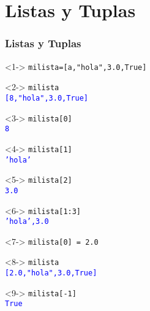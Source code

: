 \documentclass[12pt]{beamer}
\begin{document}
\section{Listas y Tuplas}
\begin{frame}[fragile]
\frametitle{Listas y Tuplas}
\fontsize{12}{12}\selectfont
\begin{minipage}{5.5cm}
\begin{exampleblock}{}<1->
	\verb|milista=[a,"hola",3.0,True]|
\end{exampleblock}
\begin{exampleblock}{}<2->
	\verb|milista| \\
	\pause
	\textcolor{blue}{\texttt{[8,"hola",3.0,True]}}
\end{exampleblock}
\begin{exampleblock}{}<3->
	\verb|milista[0]| \\
	\pause
	\textcolor{blue}{\texttt{8}}
\end{exampleblock}
\begin{exampleblock}{}<4->
	\verb|milista[1]| \\
	\pause
	\textcolor{blue}{\texttt{'hola'}}
\end{exampleblock}
\begin{exampleblock}{}<5->
	\verb|milista[2]| \\
	\pause
	\textcolor{blue}{\texttt{3.0}}
\end{exampleblock}
\end{minipage}
\hspace{0.5cm}
\begin{minipage}{5.5cm}
\begin{exampleblock}{}<6->
	\verb|milista[1:3]| \\
	\pause
	\textcolor{blue}{\texttt{'hola',3.0}}
\end{exampleblock}
\begin{exampleblock}{}<7->
	\verb|milista[0] = 2.0|
\end{exampleblock}
\begin{exampleblock}{}<8->
	\verb|milista| \\
	\pause
	\textcolor{blue}{\texttt{[2.0,"hola",3.0,True]}}
\end{exampleblock}
\begin{exampleblock}{}<9->
	\verb|milista[-1]| \\
	\pause
	\textcolor{blue}{\texttt{True}}
\end{exampleblock}
\end{minipage}
\end{frame}
\end{document}
